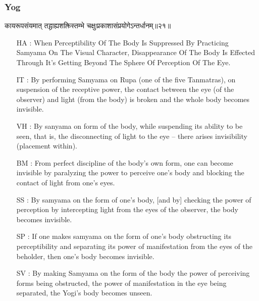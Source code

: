 \begin{frame}[fragile]\frametitle{Yog}
\begin{sanskrit}
कायरूपसंयमात् तद्ग्राह्यशक्तिस्तम्भे चक्षुःप्रकाशासंप्रयोगेऽन्तर्धानम्॥२१॥
\end{sanskrit}

	\begin{itemize}
	\item [HA]: When Perceptibility Of The Body Is Suppressed By Practicing Samyama On The Visual Character, Disappearance Of The Body Is Effected Through It’s Getting Beyond The Sphere Of Perception Of The Eye.
	\item [IT]: By performing Samyama on Rupa (one of the five Tanmatras), on suspension of the receptive power, the contact between the eye (of the observer) and light (from the body) is broken and the whole body becomes invisible.
	\item [VH]: By sanyama on form of the body, while suspending its ability to be seen, that is, the disconnecting of light to the eye – there arises invisibility (placement within).
	\item [BM]: From perfect discipline of the body’s own form, one can become invisible by paralyzing the power to perceive one’s body and blocking the contact of light from one’s eyes.
	\item [SS]: By samyama on the form of one’s body, [and by] checking the power of perception by intercepting light from the eyes of the observer, the body becomes invisible.
	\item [SP]: If one makes samyama on the form of one’s body obstructing its perceptibility and separating its power of manifestation from the eyes of the beholder, then one’s body becomes invisible.
	\item [SV]: By making Samyama on the form of the body the power of perceiving forms being obstructed, the power of manifestation in the eye being separated, the Yogi’s body becomes unseen. 
	\end{itemize}
\end{frame}

